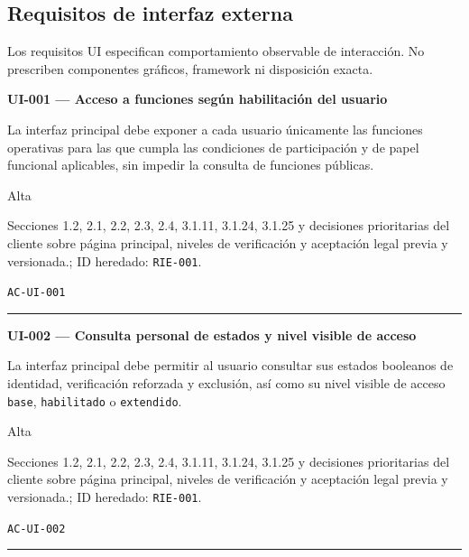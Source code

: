 \documentclass[10pt,letterpaper]{article}
\begin{document}
\subsection{Requisitos de interfaz externa}
Los requisitos UI especifican comportamiento observable de interacción. No prescriben componentes gráficos, framework ni disposición exacta.

\noindent\textbf{UI-001 --- Acceso a funciones según habilitación del usuario}\par
\begin{description}[style=nextline,leftmargin=3.15cm,labelwidth=2.8cm,font=\normalfont\bfseries]
\item[Obligación] La interfaz principal debe exponer a cada usuario únicamente las funciones operativas para las que cumpla las condiciones de participación y de papel funcional aplicables, sin impedir la consulta de funciones públicas.
\item[Prioridad] Alta
\item[Procedencia] Secciones 1.2, 2.1, 2.2, 2.3, 2.4, 3.1.11, 3.1.24, 3.1.25 y decisiones prioritarias del cliente sobre página principal, niveles de verificación y aceptación legal previa y versionada.; ID heredado: \texttt{RIE-001}.
\item[Verificación] \texttt{AC-UI-001}
\end{description}
\vspace{0.25em}\hrule\vspace{0.65em}
\noindent\textbf{UI-002 --- Consulta personal de estados y nivel visible de acceso}\par
\begin{description}[style=nextline,leftmargin=3.15cm,labelwidth=2.8cm,font=\normalfont\bfseries]
\item[Obligación] La interfaz principal debe permitir al usuario consultar sus estados booleanos de identidad, verificación reforzada y exclusión, así como su nivel visible de acceso \texttt{base}, \texttt{habilitado} o \texttt{extendido}.
\item[Prioridad] Alta
\item[Procedencia] Secciones 1.2, 2.1, 2.2, 2.3, 2.4, 3.1.11, 3.1.24, 3.1.25 y decisiones prioritarias del cliente sobre página principal, niveles de verificación y aceptación legal previa y versionada.; ID heredado: \texttt{RIE-001}.
\item[Verificación] \texttt{AC-UI-002}
\end{description}
\vspace{0.25em}\hrule\vspace{0.65em}
\end{document}
